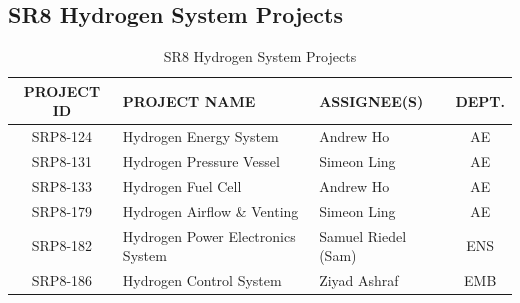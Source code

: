     \subsection{SR8 Hydrogen System Projects}
        \begin{table}[h]
            \centering
            \renewcommand{\arraystretch}{1.2}
            \begin{tabularx}{\textwidth}{|c|X|X|c|}
            \hline
            \textbf{PROJECT ID} & \textbf{PROJECT NAME} & \textbf{ASSIGNEE(S)} & \textbf{DEPT.} \\
            \hline
            SRP8-124 & Hydrogen Energy System & Andrew Ho & AE \\
            SRP8-131 & Hydrogen Pressure Vessel & Simeon Ling & AE \\
            SRP8-133 & Hydrogen Fuel Cell & Andrew Ho & AE \\
            SRP8-179 & Hydrogen Airflow \& Venting & Simeon Ling & AE \\
            SRP8-182 & Hydrogen Power Electronics System & Samuel Riedel (Sam) & ENS \\
            SRP8-186 & Hydrogen Control System & Ziyad Ashraf & EMB \\
            \hline
            \end{tabularx}
            \caption{SR8 Hydrogen System Projects}
            \label{tab:hydrogen-projects}
        \end{table}

